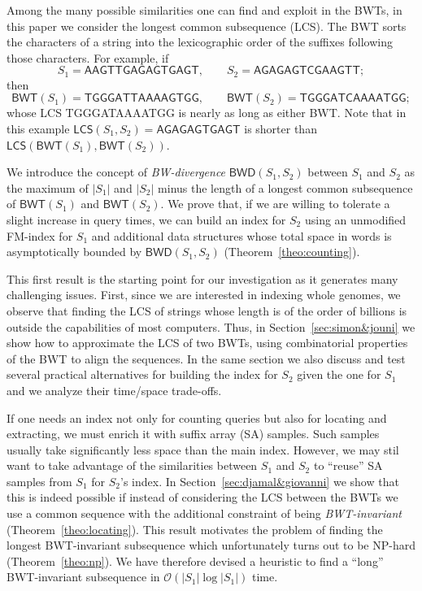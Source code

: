 \documentclass{llncs}
\newcommand{\Oh}[1]
  {\ensuremath{\mathcal{O}\!\left( {#1} \right)}}
\newcommand{\LCS}
  {\ensuremath{\mathsf{LCS}}}
\newcommand{\BWD}
  {\ensuremath{\mathsf{BWD}}}
\newcommand{\BWT}
  {\ensuremath{\mathsf{BWT}}}
\begin{document}
Among the many possible similarities one can find and exploit in the BWTs, in
this paper we consider the longest common subsequence (LCS). The BWT sorts
the characters of a string into the lexicographic order of the suffixes
following those characters.  For example, if
$$
S_1 = \mathsf{AAGTTGAGAGTGAGT},\qquad
S_2 = \mathsf{AGAGAGTCGAAGTT};
$$
then
$$
\BWT (S_1) = \mathsf{TGGGATTAAAAGTGG},\qquad
\BWT (S_2) = \mathsf{TGGGATCAAAATGG};
$$
whose LCS {\sf TGGGATAAAATGG} is nearly as long as either BWT. Note that in
this example $\LCS(S_1,S_2)=\mathsf{AGAGAGTGAGT}$ is shorter than $\LCS(\BWT
(S_1),\BWT (S_2))$.

We introduce the concept of {\em BW-divergence}
\(\BWD (S_1, S_2)\) between $S_1$ and $S_2$ as the maximum of $|S_1|$ and
$|S_2|$ minus the length of a longest common subsequence of $\BWT (S_1)$ and
$\BWT (S_2)$. We prove that, if we are willing to tolerate a slight increase
in query times, we can build an index for $S_2$ using an unmodified FM-index
for $S_1$ and additional data structures whose total space in words is
asymptotically bounded by $\BWD (S_1, S_2)$ (Theorem~\ref{theo:counting}).

This first result is the starting point for our investigation as it generates
many challenging issues. First, since we are interested in indexing whole
genomes, we observe that finding the LCS of strings
whose length is of the order of billions is outside the capabilities of most
computers. Thus, in Section~\ref{sec:simon&jouni} we show how to approximate
the LCS of two BWTs, using combinatorial properties of
the BWT to align the sequences. In the same section we also discuss and test
several practical alternatives for building the index for $S_2$ given the one
for $S_1$ and we analyze their time/space trade-offs.

If one needs an index not only for counting queries but also for
locating and extracting, we must enrich it with suffix array (SA) samples.
Such samples usually take significantly less space than the main index.
However, we may stil want to take advantage of the similarities between $S_1$
and $S_2$ to ``reuse'' SA samples from $S_1$ for $S_2$'s index. In
Section~\ref{sec:djamal&giovanni} we show that this is indeed possible if
instead of considering the LCS between the BWTs we use a common sequence with
the additional constraint of being {\em BWT-invariant}
(Theorem~\ref{theo:locating}). This result motivates the problem of finding
the longest BWT-invariant subsequence which unfortunately turns out to be
NP-hard (Theorem~\ref{theo:np}). We have therefore devised a heuristic to
find a ``long'' BWT-invariant subsequence in $\Oh{|S_1|\log|S_1|}$ time.
\end{document}
